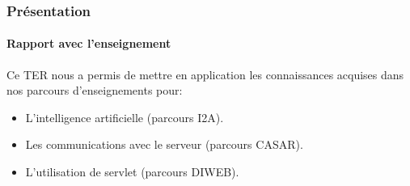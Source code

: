 \begin{frame}
\frametitle{Présentation}
\framesubtitle{Rapport avec l'enseignement}
Ce TER nous a permis de mettre en application les connaissances acquises dans nos parcours d'enseignements  pour: \\

	\begin{itemize}
		\item L'intelligence artificielle (parcours I2A).
		\item Les communications avec le serveur (parcours CASAR).
		\item L'utilisation de servlet (parcours DIWEB).
	\end{itemize}
	
\end{frame}



